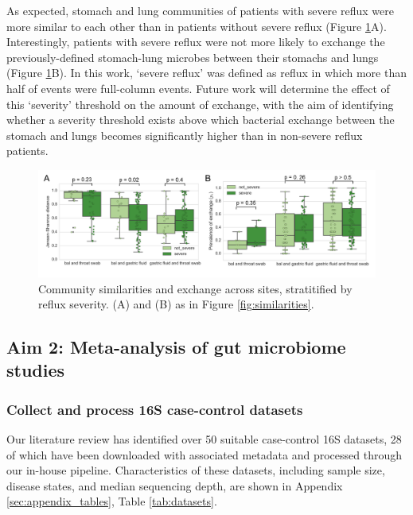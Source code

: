 \documentclass[12pt]{article}
\begin{document}
As expected, stomach and lung communities of patients with severe reflux were
more similar to each other than in patients without
severe reflux (Figure \ref{fig:reflux}A). 
Interestingly, patients with severe reflux were not more likely
to exchange the previously-defined stomach-lung microbes between their stomachs and lungs (Figure \ref{fig:reflux}B).
In this work, `severe reflux' was defined as reflux in 
which more than half of events were full-column events.
Future work will determine the effect of this `severity' 
threshold on the amount of exchange, with the aim
of identifying whether a severity threshold exists above which bacterial exchange
between the stomach and lungs becomes significantly higher than in non-severe reflux patients.

\begin{figure}[h]
\begin{center}
	\includegraphics[scale=0.65]{reflux}
	\caption{Community similarities and exchange across sites, stratitified by reflux severity.
	(A) and (B) as in Figure \ref{fig:similarities}.}
	\label{fig:reflux}
\end{center}
\end{figure}


\subsection{Aim 2: Meta-analysis of gut microbiome studies}

\subsubsection{Collect and process 16S case-control datasets}
Our literature review has identified over 50 suitable case-control 16S datasets,
28 of which have been downloaded with associated metadata and processed through our in-house pipeline.
Characteristics of these datasets, including sample size, disease states,
and median sequencing depth, are shown in Appendix \ref{sec:appendix_tables}, Table \ref{tab:datasets}.
\end{document}
